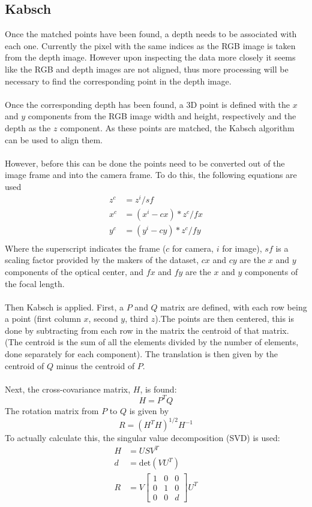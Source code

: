 \documentclass[12pt,a4paper]{article}
\begin{document}
\subsection{Kabsch}
\label{ssec: kabsch}
Once the matched points have been found, a depth needs to be associated with each one. Currently the pixel with the same indices as the RGB image is taken from the depth image. However upon inspecting the data more closely it seems like the RGB and depth images are not aligned, thus more processing will be necessary to find the corresponding point in the depth image.
\\\\
Once the corresponding depth has been found, a 3D point is defined with the $x$ and $y$ components from the RGB image width and height, respectively and the depth as the $z$ component. As these points are matched, the Kabsch algorithm can be used to align them.
\\\\
However, before this can be done the points need to be converted out of the image frame and into the camera frame. To do this, the following equations are used
\begin{align*}
z^c &= z^i /sf \\
x^c &= (x^i - cx)*z^c / fx \\
y^c &= (y^i - cy)*z^c / fy \\
\end{align*}
Where the superscript indicates the frame ($c$ for camera, $i$ for image), $sf$ is a scaling factor provided by the makers of the dataset, $cx$ and $cy$ are the $x$ and $y$ components of the optical center, and $fx$ and $fy$ are the $x$ and $y$ components of the focal length.
\\\\
Then Kabsch is applied. First, a $P$ and $Q$ matrix are defined, with each row being a point (first column $x$, second $y$, third $z$).The points are then centered, this is done by subtracting from each row in the matrix the centroid of that matrix. (The centroid is the sum of all the elements divided by the number of elements, done separately for each component). The translation is then given by the centroid of $Q$ minus the centroid of $P$.
\\\\
Next, the cross-covariance matrix, $H$, is found:
\[
H = P^T Q
\]
The rotation matrix from $P$ to $Q$ is given by 
\[
R = (H^TH)^{1/2}H^{-1}
\]
To actually calculate this, the singular value decomposition (SVD) is used:
\begin{align*}
H &= USV^T \\
d &= \text{det}(VU^T) \\
R &= V \begin{bmatrix} 1 & 0 & 0 \\ 0 & 1 & 0 \\ 0 & 0 & d \end{bmatrix} U^T
\end{align*}
\end{document}
